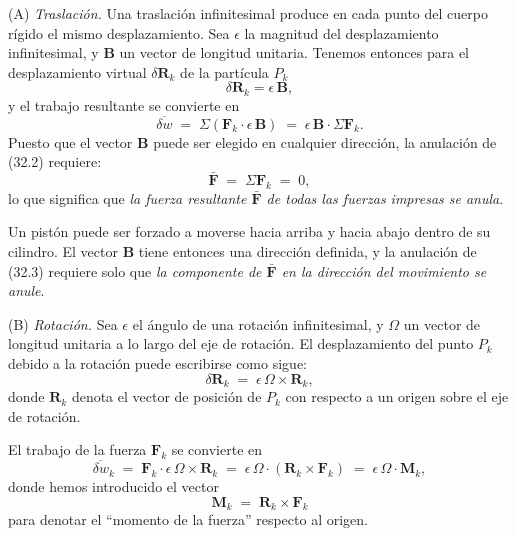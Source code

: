\medskip
\noindent (A) \textit{Traslación.} Una traslación infinitesimal produce en cada punto del cuerpo rígido el mismo desplazamiento. Sea $\epsilon$ la magnitud del desplazamiento infinitesimal, y $\mathbf{B}$ un vector de longitud unitaria. Tenemos entonces para el desplazamiento virtual $\delta\mathbf{R}_k$ de la partícula $P_k$
\begin{equation}
\delta\mathbf{R}_k = \epsilon\,\mathbf{B}, \tag{32.1}
\end{equation}
y el trabajo resultante se convierte en
\begin{equation}
\overline{\delta w} \;=\; \Sigma(\mathbf{F}_k \cdot \epsilon\,\mathbf{B}) \;=\; \epsilon\,\mathbf{B} \cdot \Sigma\mathbf{F}_k. \tag{32.2}
\end{equation}
Puesto que el vector $\mathbf{B}$ puede ser elegido en cualquier dirección, la anulación de (32.2) requiere:
\begin{equation}
\bar{\mathbf{F}} \;=\; \Sigma\mathbf{F}_k \;=\; 0, \tag{32.3}
\end{equation}
lo que significa que \emph{la fuerza resultante $\bar{\mathbf{F}}$ de todas las fuerzas impresas se anula}.

Un pistón puede ser forzado a moverse hacia arriba y hacia abajo dentro de su cilindro. El vector $\mathbf{B}$ tiene entonces una dirección definida, y la anulación de (32.3) requiere solo que \emph{la componente de $\bar{\mathbf{F}}$ en la dirección del movimiento se anule}.

\medskip
\noindent (B) \textit{Rotación.} Sea $\epsilon$ el ángulo de una rotación infinitesimal, y $\Omega$ un vector de longitud unitaria a lo largo del eje de rotación. El desplazamiento del punto $P_k$ debido a la rotación puede escribirse como sigue:
\begin{equation}
\delta\mathbf{R}_k \;=\; \epsilon\,\Omega \times \mathbf{R}_k, \tag{32.4}
\end{equation}
donde $\mathbf{R}_k$ denota el vector de posición de $P_k$ con respecto a un origen sobre el eje de rotación.

El trabajo de la fuerza $\mathbf{F}_k$ se convierte en
\begin{equation}
\overline{\delta w}_k \;=\; \mathbf{F}_k \cdot \epsilon\,\Omega \times \mathbf{R}_k \;=\; \epsilon\,\Omega \cdot (\mathbf{R}_k \times \mathbf{F}_k) \;=\; \epsilon\,\Omega \cdot \mathbf{M}_k, \tag{32.5}
\end{equation}
donde hemos introducido el vector
\begin{equation}
\mathbf{M}_k \;=\; \mathbf{R}_k \times \mathbf{F}_k \tag{32.6}
\end{equation}
para denotar el ``momento de la fuerza'' respecto al origen.

